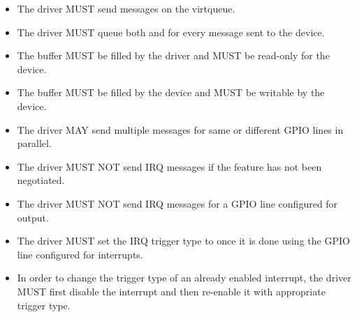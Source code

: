 
\begin{itemize}
\item The driver MUST send messages on the  virtqueue.

\item The driver MUST queue both  and
     for every message sent to the device.

\item The  buffer MUST be filled by the driver
    and MUST be read-only for the device.

\item The  buffer MUST be filled by the
    device and MUST be writable by the device.

\item The driver MAY send multiple messages for same or different GPIO lines in
    parallel.

\item The driver MUST NOT send IRQ messages if the 
    feature has not been negotiated.

\item The driver MUST NOT send IRQ messages for a GPIO line configured for
    output.

\item The driver MUST set the IRQ trigger type to
     once it is done using the GPIO line
    configured for interrupts.

\item In order to change the trigger type of an already enabled interrupt, the
    driver MUST first disable the interrupt and then re-enable it with
    appropriate trigger type.
\end{itemize}



